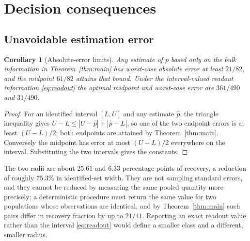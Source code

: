 \documentclass[11pt]{article}
\newtheorem{corollary}[theorem]{Corollary}
\theoremstyle{definition}
\begin{document}
\section{Decision consequences}\label{sec:decision}

\subsection{Unavoidable estimation error}
\begin{corollary}[Absolute-error limits]\label{cor:minimax}
Any estimate of $p$ based only on the bulk information in
Theorem~\ref{thm:main} has worst-case absolute error at least $21/82$, and the
midpoint $61/82$ attains that bound. Under the interval-valued readout
information \eqref{eq:readout} the optimal midpoint and worst-case error are
$361/490$ and $31/490$.
\end{corollary}
\begin{proof}
For an identified interval $[L,U]$ and any estimate $\hat p$, the triangle
inequality gives $U-L\le|U-\hat p|+|\hat p-L|$, so one of the two endpoint
errors is at least $(U-L)/2$; both endpoints are attained by
Theorem~\ref{thm:main}. Conversely the midpoint has error at most $(U-L)/2$
everywhere on the interval. Substituting the two intervals gives the
constants.
\end{proof}

The two radii are about $25.61$ and $6.33$ percentage points of recovery, a
reduction of roughly $75.3\%$ in identified-set width. They are not sampling
standard errors, and they cannot be reduced by measuring the same pooled
quantity more precisely: a deterministic procedure must return the same value
for two populations whose observations are identical, and by
Theorem~\ref{thm:main} such pairs differ in recovery fraction by up to
$21/41$. Reporting an exact readout value rather than the interval
\eqref{eq:readout} would define a smaller class and a different, smaller radius.
\end{document}
